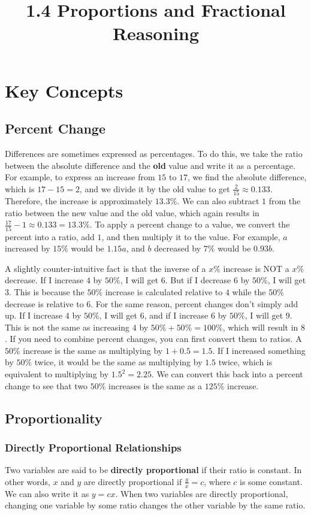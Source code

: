 \documentclass{article}
\title{1.4 Proportions and Fractional Reasoning}
\author{}
\date{}
\begin{document}
\maketitle
\section*{Key Concepts}
\subsection*{Percent Change}
Differences are sometimes expressed as percentages.
To do this, we take the ratio between the absolute difference and the \textbf{old} value and write it as a percentage.
For example, to express an increase from $15$ to $17$, we find the absolute difference, which is $17 - 15 = 2$, and we divide it by the old value to get $\frac{2}{15} \approx 0.133$.
Therefore, the increase is approximately $13.3\%$.
We can also subtract $1$ from the ratio between the new value and the old value, which again results in $\frac{17}{15} - 1 \approx 0.133 = 13.3\%$.
To apply a percent change to a value, we convert the percent into a ratio, add $1$, and then multiply it to the value.
For example, $a$ increased by $15\%$ would be $1.15a$, and $b$ decreased by $7\%$ would be $0.93b$.

A slightly counter-intuitive fact is that the inverse of a $x\%$ increase is NOT a $x\%$ decrease.
If I increase $4$ by $50\%$, I will get $6$.
But if I decrease $6$ by $50\%$, I will get $3$.
This is because the $50\%$ increase is calculated relative to $4$ while the $50\%$ decrease is relative to $6$.
For the same reason, percent changes don't simply add up.
If I increase $4$ by $50\%$, I will get $6$, and if I increase $6$ by $50\%$, I will get $9$.
This is not the same as increasing $4$ by $50\% + 50\% = 100\%$, which will result in $8$.
If you need to combine percent changes, you can first convert them to ratios.
A $50\%$ increase is the same as multiplying by $1 + 0.5 = 1.5$.
If I increased something by $50\%$ twice, it would be the same as multiplying by $1.5$ twice, which is equivalent to multiplying by $1.5^2 = 2.25$.
We can convert this back into a percent change to see that two $50\%$ increases is the same as a $125\%$ increase.

\subsection*{Proportionality}
\subsubsection*{Directly Proportional Relationships}
Two variables are said to be \textbf{directly proportional} if their ratio is constant.
In other words, $x$ and $y$ are directly proportional if $\frac{y}{x} = c$, where $c$ is some constant.
We can also write it as $y = cx$.
When two variables are directly proportional, changing one variable by some ratio changes the other variable by the same ratio.
\end{document}
